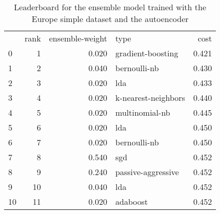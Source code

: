 \begin{table}[]
	\centering
	\begin{tabular}{lrrlr}
		   & rank & ensemble-weight & type                & cost  \\
		0  & 1    & 0.020           & gradient-boosting   & 0.421 \\
		1  & 2    & 0.040           & bernoulli-nb        & 0.430 \\
		2  & 3    & 0.020           & lda                 & 0.433 \\
		3  & 4    & 0.020           & k-nearest-neighbors & 0.440 \\
		4  & 5    & 0.020           & multinomial-nb      & 0.445 \\
		5  & 6    & 0.020           & lda                 & 0.450 \\
		6  & 7    & 0.020           & bernoulli-nb        & 0.450 \\
		7  & 8    & 0.540           & sgd                 & 0.452 \\
		8  & 9    & 0.240           & passive-aggressive  & 0.452 \\
		9  & 10   & 0.040           & lda                 & 0.452 \\
		10 & 11   & 0.020           & adaboost            & 0.452 \\
	\end{tabular}

	\caption{Leaderboard for the ensemble model trained with the Europe simple dataset and the autoencoder}
	\label{tab:lb-europe-games-simple-autoencode}
\end{table}

